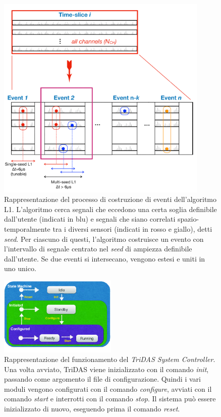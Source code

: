\documentclass[../main.tex]{subfiles}
\begin{document}
\begin{figure}[tb]
    \centering
    \includegraphics[width=0.9\textwidth]{events_trasp.png}
    \caption{
	    Rappresentazione del processo di costruzione di eventi dell'algoritmo L1. L'algoritmo cerca segnali che eccedono una certa soglia definibile dall'utente (indicati in blu) e segnali che siano correlati spazio-temporalmente tra i diversi sensori (indicati in rosso e giallo), detti \emph{seed}. Per ciascuno di questi, l'algoritmo costruisce un evento con l'intervallo di segnale centrato nel \emph{seed} di ampiezza definibile dall'utente. Se due eventi si intersecano, vengono estesi e uniti in uno unico. 
	\cite{chiarusi}}
    \label{fig:events}
\end{figure}

\begin{figure}[tb]
    \centering
    \includegraphics[width=0.5\textwidth]{tsc_scheme_color_better.png}
    \caption{
	    Rappresentazione del funzionamento del \emph{TriDAS System Controller}. Una volta avviato, TriDAS viene inizializzato con il comando \emph{init}, passando come argomento il file di configurazione. Quindi i vari moduli vengono configurati con il comando \emph{configure}, avviati con il comando \emph{start} e interrotti con il comando \emph{stop}. Il sistema può essere inizializzato di nuovo, eseguendo prima il comando \emph{reset}. 
	\cite{chiarusi}}
    \label{fig:tsc}
\end{figure}
\end{document}
